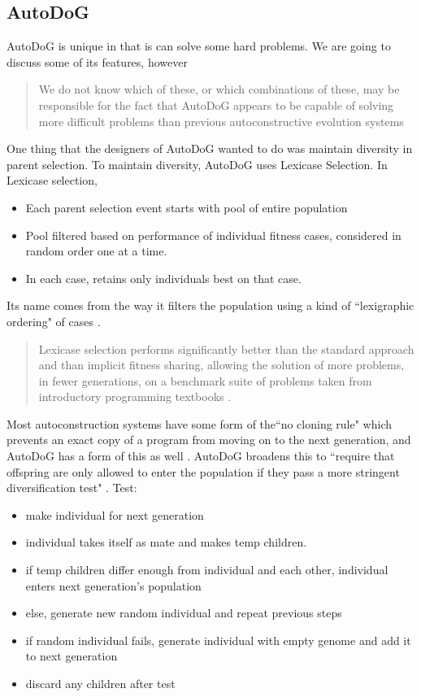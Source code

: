 \documentclass{sig-alternate}
\begin{document}

\subsection{AutoDoG}
\label{sec:autodog}

AutoDoG is unique in that is can solve some hard problems. We are going to discuss some of its features, however
\begin{quotation}
	We do not know which of these, or which combinations of these, may be responsible for the fact that AutoDoG appears to be capable of solving more difficult problems than previous autoconstructive evolution systems \cite{spector:2016}
\end{quotation}

One thing that the designers of AutoDoG wanted to do was maintain diversity in parent selection. To maintain diversity, AutoDoG uses Lexicase Selection. In Lexicase selection,
\begin{itemize}
	\item Each parent selection event starts with pool of entire population
	\item Pool filtered based on performance of individual fitness cases, considered in random order one at a time.
	\item In each case, retains only individuals best on that case.
\end{itemize}

Its name comes from the way it filters the population using a kind of ``lexigraphic ordering" of cases \cite{spector:2016}.
\begin{quotation}
	Lexicase selection performs significantly better than the standard approach and than implicit fitness sharing, allowing the solution of more problems, in fewer generations, on a benchmark suite of problems taken from introductory programming textbooks \cite{spector:2016}.
\end{quotation}

Most autoconstruction systems have some form of the``no cloning rule" which prevents an exact copy of a program from moving on to the next generation, and AutoDoG has a form of this as well \cite{spector:2016}. AutoDoG broadens this to ``require that offspring are only allowed to enter the population if they pass a more stringent diversification test" \cite{spector:2016}.
Test:
\begin{itemize}
	\item make individual for next generation
	\item individual takes itself as mate and makes temp children.
	\item if temp children differ enough from individual and each other, individual enters next generation's population
	\item else, generate new random individual and repeat previous steps
	\item if random individual fails, generate individual with empty genome and add it to next generation
	\item discard any children after test
\end{itemize}
\end{document}
